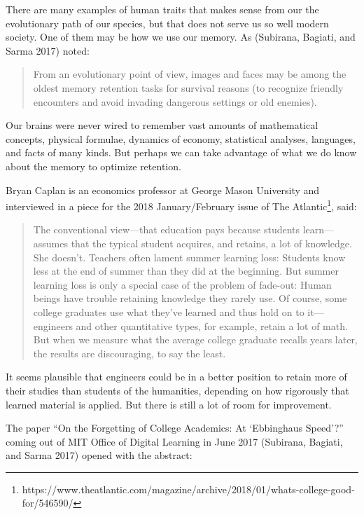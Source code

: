 There are many examples of human traits that makes sense from our the
evolutionary path of our species, but that does not serve us so well
modern society. One of them may be how we use our memory. As (Subirana,
Bagiati, and Sarma 2017) noted:

\begin{quote}
From an evolutionary point of view, images and faces may be among the
oldest memory retention tasks for survival reasons (to recognize
friendly encounters and avoid invading dangerous settings or old
enemies).
\end{quote}

Our brains were never wired to remember vast amounts of mathematical
concepts, physical formulae, dynamics of economy, statistical analyses,
languages, and facts of many kinds. But perhaps we can take advantage of
what we do know about the memory to optimize retention.

Bryan Caplan is an economics professor at George Mason University and
interviewed in a piece for the 2018 January/February issue of The
Atlantic\footnote{https://www.theatlantic.com/magazine/archive/2018/01/whats-college-good-for/546590/},
said:

\begin{quote}
The conventional view---that education pays because students
learn---assumes that the typical student acquires, and retains, a lot of
knowledge. She doesn't. Teachers often lament summer learning loss:
Students know less at the end of summer than they did at the beginning.
But summer learning loss is only a special case of the problem of
fade-out: Human beings have trouble retaining knowledge they rarely use.
Of course, some college graduates use what they've learned and thus hold
on to it---engineers and other quantitative types, for example, retain a
lot of math. But when we measure what the average college graduate
recalls years later, the results are discouraging, to say the least.
\end{quote}

It seems plausible that engineers could be in a better position to
retain more of their studies than students of the humanities, depending
on how rigorously that learned material is applied. But there is still a
lot of room for improvement.

The paper ``On the Forgetting of College Academics: At `Ebbinghaus
Speed'?'' coming out of MIT Office of Digital Learning in June 2017
(Subirana, Bagiati, and Sarma 2017) opened with the abstract:

